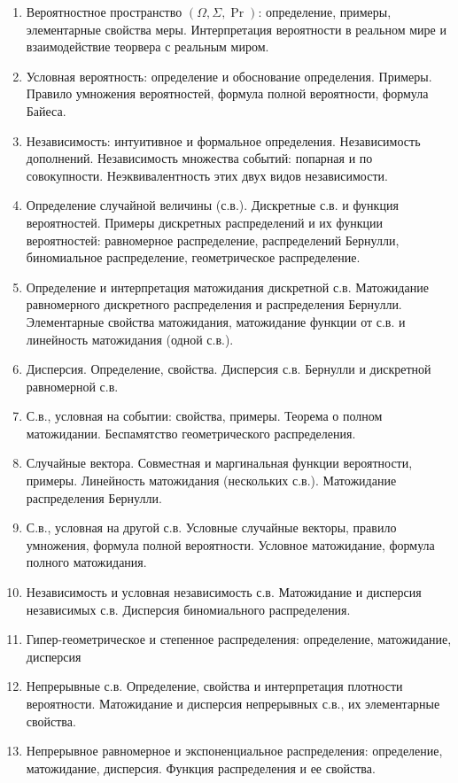 \documentclass[12pt]{article}
\begin{document}
\begin{enumerate}
  \item Вероятностное пространство $(\Omega, \Sigma, \Pr)$: определение, примеры, элементарные свойства меры. Интерпретация вероятности в реальном мире и взаимодействие теорвера с реальным миром.
  \item Условная вероятность: определение и обоснование определения. Примеры. Правило умножения вероятностей, формула полной вероятности, формула Байеса.
  \item Независимость: интуитивное и формальное определения. Независимость дополнений. Независимость множества событий: попарная и по совокупности. Неэквивалентность этих двух видов независимости.
  \item Определение случайной величины (с.в.). Дискретные с.в. и функция вероятностей. Примеры дискретных распределений и их функции вероятностей: равномерное распределение, распределений Бернулли, биномиальное распределение, геометрическое распределение.
  \item Определение и интерпретация матожидания дискретной с.в. Матожидание равномерного дискретного распределения и распределения Бернулли. Элементарные свойства матожидания, матожидание функции от с.в. и линейность матожидания (одной с.в.).
  \item Дисперсия. Определение, свойства. Дисперсия с.в. Бернулли и дискретной равномерной с.в.
  \item С.в., условная на событии: свойства, примеры. Теорема о полном матожидании. Беспамятство геометрического распределения.
  \item Случайные вектора. Совместная и маргинальная функции вероятности, примеры. Линейность матожидания (нескольких с.в.). Матожидание распределения Бернулли.
  \item С.в., условная на другой с.в. Условные случайные векторы, правило умножения, формула полной вероятности. Условное матожидание, формула полного матожидания.
  \item Независимость и условная независимость с.в. Матожидание и дисперсия независимых с.в. Дисперсия биномиального распределения.
  \item Гипер-геометрическое и степенное распределения: определение, матожидание, дисперсия
  \item Непрерывные с.в. Определение, свойства и интерпретация плотности вероятности. Матожидание и дисперсия непрерывных с.в., их элементарные свойства.
  \item Непрерывное равномерное и экспоненциальное распределения: определение, матожидание, дисперсия. Функция распределения и ее свойства.

\end{enumerate}
\end{document}
